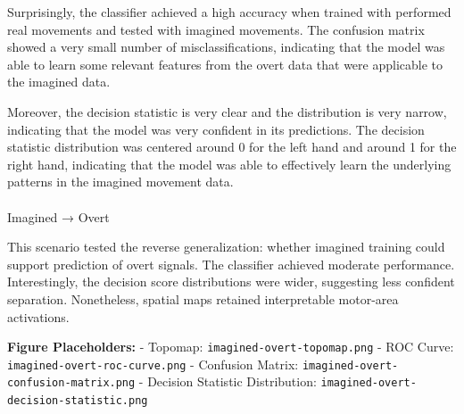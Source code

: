 \documentclass[
  letterpaper,
  DIV=11,
  numbers=noendperiod]{scrartcl}
\makeatletter
\let\oldparagraph\paragraph
\renewcommand{\paragraph}{
    \@ifstar
      \xxxParagraphStar
      \xxxParagraphNoStar
  }
\newcommand{\xxxParagraphStar}[1]{\oldparagraph*{#1}\mbox{}}
\newcommand{\xxxParagraphNoStar}[1]{\oldparagraph{#1}\mbox{}}
\makeatother
\begin{document}
Surprisingly, the classifier achieved a high accuracy when trained with
performed real movements and tested with imagined movements. The
confusion matrix showed a very small number of misclassifications,
indicating that the model was able to learn some relevant features from
the overt data that were applicable to the imagined data.

Moreover, the decision statistic is very clear and the distribution is
very narrow, indicating that the model was very confident in its
predictions. The decision statistic distribution was centered around 0
for the left hand and around 1 for the right hand, indicating that the
model was able to effectively learn the underlying patterns in the
imagined movement data.

\paragraph{Imagined → Overt}\label{imagined-overt}

This scenario tested the reverse generalization: whether imagined
training could support prediction of overt signals. The classifier
achieved moderate performance. Interestingly, the decision score
distributions were wider, suggesting less confident separation.
Nonetheless, spatial maps retained interpretable motor-area activations.

\textbf{Figure Placeholders:} - Topomap:
\texttt{imagined-overt-topomap.png} - ROC Curve:
\texttt{imagined-overt-roc-curve.png} - Confusion Matrix:
\texttt{imagined-overt-confusion-matrix.png} - Decision Statistic
Distribution: \texttt{imagined-overt-decision-statistic.png}
\end{document}
